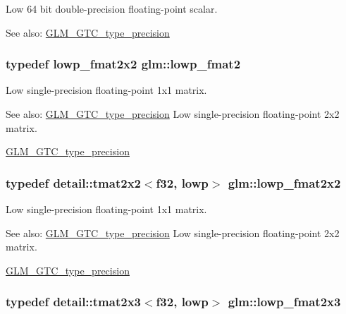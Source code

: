 Low 64 bit double-precision floating-point scalar. \begin{Desc}
\item[See also:]\hyperlink{group__gtc__type__precision}{GLM\_\-GTC\_\-type\_\-precision} \end{Desc}
\hypertarget{group__gtc__type__precision_g9bafb192cb7327d543ad55be2e6e675c}{
\subsubsection[lowp\_\-fmat2]{\setlength{\rightskip}{0pt plus 5cm}typedef lowp\_\-fmat2x2 {\bf glm::lowp\_\-fmat2}}}
\label{group__gtc__type__precision_g9bafb192cb7327d543ad55be2e6e675c}


Low single-precision floating-point 1x1 matrix. \begin{Desc}
\item[See also:]\hyperlink{group__gtc__type__precision}{GLM\_\-GTC\_\-type\_\-precision} Low single-precision floating-point 2x2 matrix. 

\hyperlink{group__gtc__type__precision}{GLM\_\-GTC\_\-type\_\-precision} \end{Desc}
\hypertarget{group__gtc__type__precision_g99367a30c64035d7e7f76410105d10e3}{
\subsubsection[lowp\_\-fmat2x2]{\setlength{\rightskip}{0pt plus 5cm}typedef detail::tmat2x2$<$f32, lowp$>$ {\bf glm::lowp\_\-fmat2x2}}}
\label{group__gtc__type__precision_g99367a30c64035d7e7f76410105d10e3}


Low single-precision floating-point 1x1 matrix. \begin{Desc}
\item[See also:]\hyperlink{group__gtc__type__precision}{GLM\_\-GTC\_\-type\_\-precision} Low single-precision floating-point 2x2 matrix. 

\hyperlink{group__gtc__type__precision}{GLM\_\-GTC\_\-type\_\-precision} \end{Desc}
\hypertarget{group__gtc__type__precision_g01c5c29a6cee22c3e75de25c98dbecc9}{
\subsubsection[lowp\_\-fmat2x3]{\setlength{\rightskip}{0pt plus 5cm}typedef detail::tmat2x3$<$f32, lowp$>$ {\bf glm::lowp\_\-fmat2x3}}}
\label{group__gtc__type__precision_g01c5c29a6cee22c3e75de25c98dbecc9}


